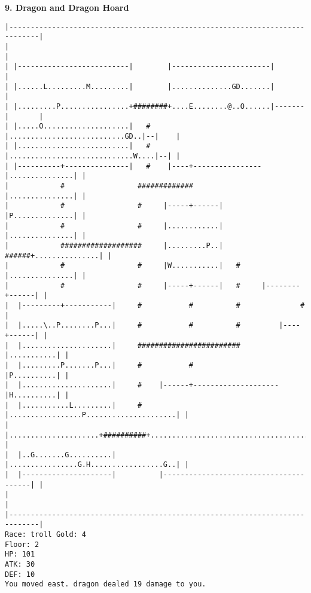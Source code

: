\documentclass[11pt]{article}
\theoremstyle{plain}
\begin{document}
\textbf{9. Dragon and Dragon Hoard}

\begin{Verbatim}[fontsize=\small]
|-----------------------------------------------------------------------------|
|                                                                             |
| |--------------------------|        |-----------------------|               |
| |......L.........M.........|        |..............GD.......|               |
| |.........P................+########+....E........@..O......|-------|       |
| |.....O....................|   #    |...........................GD..|--|    |
| |..........................|   #    |.............................W....|--| |
| |----------+---------------|   #    |----+----------------|...............| |
|            #                 #############                |...............| |
|            #                 #     |-----+------|         |P..............| |
|            #                 #     |............|         |...............| |
|            ###################     |.........P..|   ######+...............| |
|            #                 #     |W...........|   #     |...............| |
|            #                 #     |-----+------|   #     |--------+------| |
|  |---------+-----------|     #           #          #              #        |
|  |.....\..P........P...|     #           #          #         |----+------| |
|  |.....................|     ########################         |...........| |
|  |.........P.......P...|     #           #                    |P..........| |
|  |.....................|     #    |------+--------------------|H..........| |
|  |...........L.........|     #    |.................P.....................| |
|  |.....................+##########+.......................................| |
|  |..G.......G..........|          |................G.H.................G..| |
|  |---------------------|          |---------------------------------------| |
|                                                                             |
|-----------------------------------------------------------------------------|
Race: troll Gold: 4                                                    Floor: 2
HP: 101
ATK: 30
DEF: 10
You moved east. dragon dealed 19 damage to you. 
\end{Verbatim}
\end{document}
